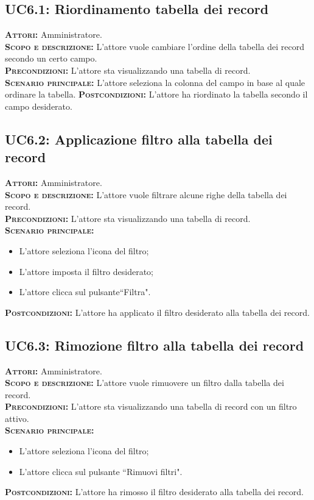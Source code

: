 \subsection{UC6.1: Riordinamento tabella dei record}
\label{sec:UC61}
\textsc{\textbf{Attori:}} Amministratore.\\
\textsc{\textbf{Scopo e descrizione:}} L'attore vuole cambiare l'ordine della tabella dei record secondo un certo campo.\\
\textsc{\textsc{\textbf{Precondizioni:}}} L'attore sta visualizzando una tabella di record.\\
\textsc{\textbf{Scenario principale:}} L'attore seleziona la colonna del campo in base al quale ordinare la tabella.
\textsc{\textbf{Postcondizioni:}} L'attore ha riordinato la tabella secondo il campo desiderato.

\subsection{UC6.2: Applicazione filtro alla tabella dei record}
\label{sec:UC62}
\textsc{\textbf{Attori:}} Amministratore.\\
\textsc{\textbf{Scopo e descrizione:}} L'attore vuole filtrare alcune righe della tabella dei record.\\
\textsc{\textsc{\textbf{Precondizioni:}}} L'attore sta visualizzando una tabella di record.\\
\textsc{\textbf{Scenario principale:}} 
\begin{itemize}
    \item L'attore seleziona l'icona del filtro;
    \item L'attore imposta il filtro desiderato;
    \item L'attore clicca sul pulsante``Filtra".
\end{itemize}
\textsc{\textbf{Postcondizioni:}} L'attore ha applicato il filtro desiderato alla tabella dei record.

\subsection{UC6.3: Rimozione filtro alla tabella dei record}
\label{sec:UC63}
\textsc{\textbf{Attori:}} Amministratore.\\
\textsc{\textbf{Scopo e descrizione:}} L'attore vuole rimuovere un filtro dalla tabella dei record.\\
\textsc{\textsc{\textbf{Precondizioni:}}} L'attore sta visualizzando una tabella di record con un filtro attivo.\\
\textsc{\textbf{Scenario principale:}} 
\begin{itemize}
    \item L'attore seleziona l'icona del filtro;
    \item L'attore clicca sul pulsante ``Rimuovi filtri".
\end{itemize}
\textsc{\textbf{Postcondizioni:}} L'attore ha rimosso il filtro desiderato alla tabella dei record.

